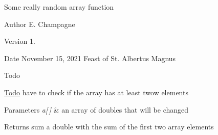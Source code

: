 Some really random array function

\begin{DoxyAuthor}{Author}
E. Champagne
\end{DoxyAuthor}
\begin{DoxyVersion}{Version}
1.
\end{DoxyVersion}
\begin{DoxyDate}{Date}
November 15, 2021 Feast of St. Albertus Magnus
\end{DoxyDate}
\begin{DoxyRefDesc}{Todo}
\item[\mbox{\hyperlink{todo__todo000001}{Todo}}]have to check if the array has at least twow elements\end{DoxyRefDesc}



\begin{DoxyParams}{Parameters}
{\em a\mbox{[}$\,$\mbox{]}} & an array of doubles that will be changed\\
\hline
\end{DoxyParams}
\begin{DoxyReturn}{Returns}
sum a double with the sum of the first two array elements 
\end{DoxyReturn}
